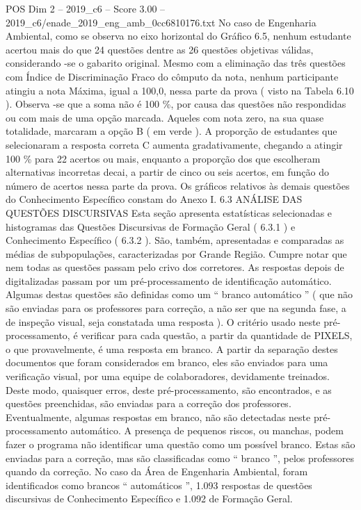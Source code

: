 \begin{textsample}{POS Dim 2 – 2019\_c6 – Score 3.00 – 2019\_c6/enade\_2019\_eng\_amb\_0cc6810176.txt}
No caso de Engenharia Ambiental, como se observa no eixo horizontal do Gráfico 6.5, nenhum estudante acertou mais do que 24 questões dentre as 26 questões objetivas válidas, considerando -se o gabarito original.
Mesmo com a eliminação das três questões com Índice de Discriminação Fraco do cômputo da nota, nenhum participante atingiu a nota Máxima, igual a 100,0, nessa parte da prova ( visto na Tabela 6.10 ).
Observa -se que a soma não é 100 \%, por causa das questões não respondidas ou com mais de uma opção marcada.
Aqueles com nota zero, na sua quase totalidade, marcaram a opção B ( em verde ).
A proporção de estudantes que selecionaram a resposta correta C aumenta gradativamente, chegando a atingir 100 \% para 22 acertos ou mais, enquanto a proporção dos que escolheram alternativas incorretas decai, a partir de cinco ou seis acertos, em função do número de acertos nessa parte da prova.
Os gráficos relativos às demais questões do Conhecimento Específico constam do Anexo I. 6.3 ANÁLISE DAS QUESTÕES DISCURSIVAS Esta seção apresenta estatísticas selecionadas e histogramas das Questões Discursivas de Formação Geral ( 6.3.1 ) e Conhecimento Específico ( 6.3.2 ).
São, também, apresentadas e comparadas as médias de subpopulações, caracterizadas por Grande Região.
Cumpre notar que nem todas as questões passam pelo crivo dos corretores.
As respostas depois de digitalizadas passam por um pré-processamento de identificação automático.
Algumas destas questões são definidas como um “ branco automático ” ( que não são enviadas para os professores para correção, a não ser que na segunda fase, a de inspeção visual, seja constatada uma resposta ).
O critério usado neste pré-processamento, é verificar para cada questão, a partir da quantidade de PIXELS, o que provavelmente, é uma resposta em branco.
A partir da separação destes documentos que foram considerados em branco, eles são enviados para uma verificação visual, por uma equipe de colaboradores, devidamente treinados.
Deste modo, quaisquer erros, deste pré-processamento, são encontrados, e as questões preenchidas, são enviadas para a correção dos professores.
Eventualmente, algumas respostas em branco, não são detectadas neste pré-processamento automático.
A presença de pequenos riscos, ou manchas, podem fazer o programa não identificar uma questão como um possível branco.
Estas são enviadas para a correção, mas são classificadas como “ branco ”, pelos professores quando da correção.
No caso da Área de Engenharia Ambiental, foram identificados como brancos “ automáticos ”, 1.093 respostas de questões discursivas de Conhecimento Específico e 1.092 de Formação Geral.

\end{textsample}
